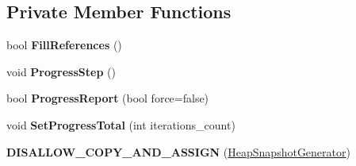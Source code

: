 \subsection*{Private Member Functions}
\begin{DoxyCompactItemize}
\item 
bool {\bfseries Fill\+References} ()\hypertarget{classv8_1_1internal_1_1_heap_snapshot_generator_a66198a94726fa80496fad091fcd368ac}{}\label{classv8_1_1internal_1_1_heap_snapshot_generator_a66198a94726fa80496fad091fcd368ac}

\item 
void {\bfseries Progress\+Step} ()\hypertarget{classv8_1_1internal_1_1_heap_snapshot_generator_ac14506867de1c049c20053e28d03b4aa}{}\label{classv8_1_1internal_1_1_heap_snapshot_generator_ac14506867de1c049c20053e28d03b4aa}

\item 
bool {\bfseries Progress\+Report} (bool force=false)\hypertarget{classv8_1_1internal_1_1_heap_snapshot_generator_aba3f0cfd0ef9003d877201bd9b58511b}{}\label{classv8_1_1internal_1_1_heap_snapshot_generator_aba3f0cfd0ef9003d877201bd9b58511b}

\item 
void {\bfseries Set\+Progress\+Total} (int iterations\+\_\+count)\hypertarget{classv8_1_1internal_1_1_heap_snapshot_generator_a7de3562917fe8c7af39cd8c0e1601e32}{}\label{classv8_1_1internal_1_1_heap_snapshot_generator_a7de3562917fe8c7af39cd8c0e1601e32}

\item 
{\bfseries D\+I\+S\+A\+L\+L\+O\+W\+\_\+\+C\+O\+P\+Y\+\_\+\+A\+N\+D\+\_\+\+A\+S\+S\+I\+GN} (\hyperlink{classv8_1_1internal_1_1_heap_snapshot_generator}{Heap\+Snapshot\+Generator})\hypertarget{classv8_1_1internal_1_1_heap_snapshot_generator_ad0d8ed221bd578ad04a4b6bdff0e5013}{}\label{classv8_1_1internal_1_1_heap_snapshot_generator_ad0d8ed221bd578ad04a4b6bdff0e5013}

\end{DoxyCompactItemize}
